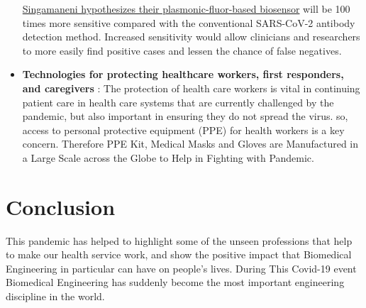 \documentclass[12pt]{article}
\begin{document}
\begin{itemize}
\href{https://teknosenin.com/newly-developed-nanotechnology-biosensor-being-adapted-for-rapid-covid-19-testing/}{Singamaneni hypothesizes their plasmonic-fluor-based biosensor} will be 100 times more sensitive compared with the conventional SARS-CoV-2 antibody detection method. Increased sensitivity would allow clinicians and researchers to more easily find positive cases and lessen the chance of false negatives.

\item \textbf{Technologies for protecting healthcare workers, first responders, and caregivers} : The protection of health care workers is vital in continuing patient care in health care systems that are currently challenged by the pandemic, but also important in ensuring they do not spread the virus. so, access to personal protective equipment (PPE) for health workers is a key concern. Therefore PPE Kit, Medical Masks and Gloves are Manufactured in a Large Scale across the Globe to Help in Fighting with Pandemic.

\end{itemize}
 

\section{Conclusion}
This pandemic has helped to highlight some of the unseen professions that help to make our health service work, and show the positive impact that Biomedical Engineering in particular can have on people's lives. During This Covid-19 event Biomedical Engineering has suddenly become the most important engineering discipline in the world.
\end{document}

